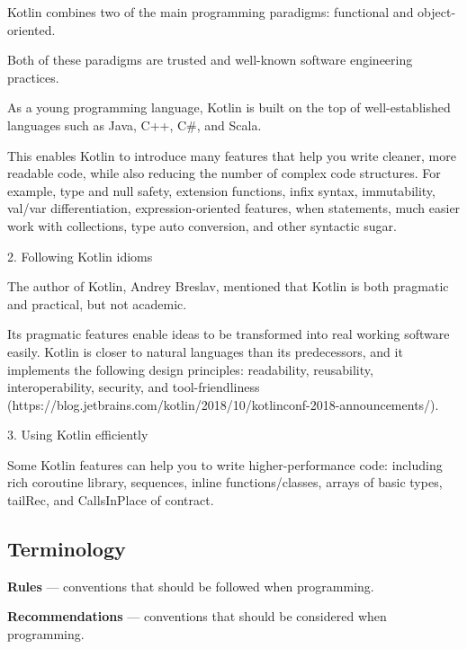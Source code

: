     Kotlin combines two of the main programming paradigms: functional and object-oriented.

    Both of these paradigms are trusted and well-known software engineering practices.

    As a young programming language, Kotlin is built on the top of well-established languages such as Java, C++, C\#, and Scala.

    This enables Kotlin to introduce many features that help you write cleaner, more readable code, while also reducing the number of complex code structures. For example, type and null safety, extension functions, infix syntax, immutability, val/var differentiation, expression-oriented features, when statements, much easier work with collections, type auto conversion, and other syntactic sugar.



2. Following Kotlin idioms



    The author of Kotlin, Andrey Breslav, mentioned that Kotlin is both pragmatic and practical, but not academic.

    Its pragmatic features enable ideas to be transformed into real working software easily. Kotlin is closer to natural languages than its predecessors, and it implements the following design principles: readability, reusability, interoperability, security, and tool-friendliness (https://blog.jetbrains.com/kotlin/2018/10/kotlinconf-2018-announcements/).



3. Using Kotlin efficiently



    Some Kotlin features can help you to write higher-performance code: including rich coroutine library, sequences, inline functions/classes, arrays of basic types, tailRec, and CallsInPlace of contract.



\subsection*{\textbf{Terminology}}



\textbf{Rules} — conventions that should be followed when programming.



\textbf{Recommendations} — conventions that should be considered when programming.



